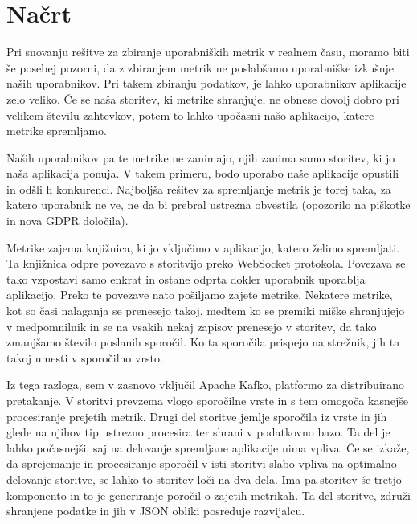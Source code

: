 \documentclass[a4paper, 12pt]{book}
\begin{document}
\section{Načrt}
\label{ch3:sec1}

Pri snovanju rešitve za zbiranje uporabniških metrik v realnem času, moramo biti še posebej pozorni, da z zbiranjem metrik ne poslabšamo uporabniške izkušnje naših uporabnikov. Pri takem zbiranju podatkov, je lahko uporabnikov aplikacije zelo veliko. Če se naša storitev, ki metrike shranjuje, ne obnese dovolj dobro pri velikem številu zahtevkov, potem to lahko upočasni našo aplikacijo, katere metrike spremljamo.

Naših uporabnikov pa te metrike ne zanimajo, njih zanima samo storitev, ki jo naša aplikacija ponuja.  V takem primeru, bodo uporabo naše aplikacije opustili in odšli h konkurenci. Najboljša rešitev za spremljanje metrik je torej taka, za katero uporabnik ne ve, ne da bi prebral ustrezna obvestila (opozorilo na piškotke in nova GDPR določila).

Metrike zajema knjižnica, ki jo vključimo v aplikacijo, katero želimo spremljati. Ta knjižnica odpre povezavo s storitvijo preko WebSocket protokola. Povezava se tako vzpostavi samo enkrat in ostane odprta dokler uporabnik uporablja aplikacijo. Preko te povezave nato pošiljamo zajete metrike. Nekatere metrike, kot so časi nalaganja se prenesejo takoj, medtem ko se premiki miške shranjujejo v medpomnilnik in se na vsakih nekaj zapisov prenesejo v storitev, da tako zmanjšamo število poslanih sporočil. Ko ta sporočila prispejo na strežnik, jih ta takoj umesti v sporočilno vrsto.

Iz tega razloga, sem v zasnovo vključil Apache Kafko, platformo za distribuirano pretakanje. V storitvi prevzema vlogo sporočilne vrste in s tem omogoča kasnejše procesiranje prejetih metrik. Drugi del storitve jemlje sporočila iz vrste in jih glede na njihov tip ustrezno procesira ter shrani v podatkovno bazo. Ta del je lahko počasnejši, saj na delovanje spremljane aplikacije nima vpliva. Če se izkaže, da sprejemanje in procesiranje sporočil v isti storitvi slabo vpliva na optimalno delovanje storitve, se lahko to storitev loči na dva dela. Ima pa storitev še tretjo komponento in to je generiranje poročil o zajetih metrikah. Ta del storitve, združi shranjene podatke in jih v JSON obliki posreduje razvijalcu.
\end{document}

